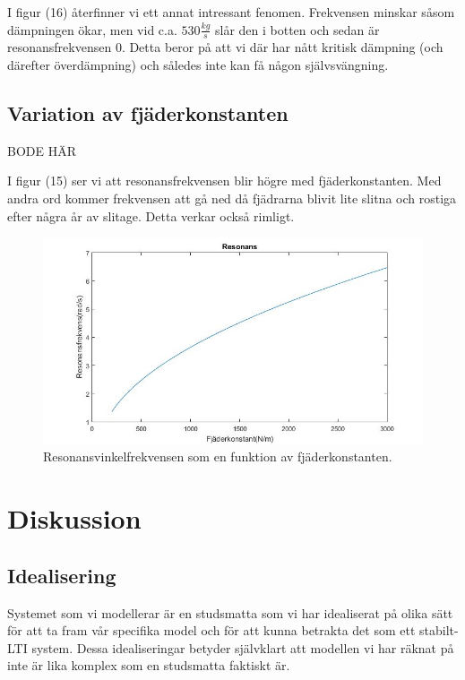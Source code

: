 \documentclass[10pt,a4paper]{article}
\begin{document}
I figur (16) återfinner vi ett annat intressant fenomen. Frekvensen minskar såsom dämpningen ökar, men vid c.a. $530\frac{kg}{s}$ slår den i botten och sedan är resonansfrekvensen $0$. Detta beror på att vi där har nått kritisk dämpning (och därefter överdämpning) och således inte kan få någon självsvängning.
\newpage

\subsection{Variation av fjäderkonstanten}

BODE HÄR

I figur (15) ser vi att resonansfrekvensen blir högre med fjäderkonstanten. Med andra ord kommer frekvensen att gå ned då fjädrarna blivit lite slitna och rostiga efter några år av slitage. Detta verkar också rimligt.

\begin{figure}[h]
\begin{center}
\includegraphics[scale=0.4]{resonansFjader}
\caption{Resonansvinkelfrekvensen som en funktion av fjäderkonstanten.}
\end{center}
\end{figure}



\section{Diskussion}

\subsection{Idealisering}
Systemet som vi modellerar är en studsmatta som vi har idealiserat på olika sätt för att ta fram vår specifika model och för att kunna betrakta det som ett stabilt-LTI system. Dessa idealiseringar betyder självklart att modellen vi har räknat på inte är lika komplex som en studsmatta faktiskt är. 
\end{document}
